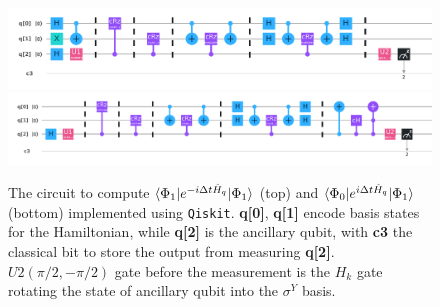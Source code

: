 \documentclass[journal=jctcce,manuscript=article]{achemso}
\begin{document}
\begin{figure}[h!]
  \centering
  \includegraphics[width=6.5in]{figs/phi1_cir4y.pdf}
  \includegraphics[width=6.5in]{figs/phi0+e1_cir_y.pdf}
  \caption{The circuit to compute $\braket{\Phi_1  | e^{-i \Delta t \hat{H}_q}  |  \Phi_1}$ (top) and $\braket{\Phi_0  | e^{i \Delta t \hat{H}_q}  |  \Phi_1}$ (bottom) implemented using \texttt{Qiskit}\cite{Qiskit}. \textbf{q[0]}, \textbf{q[1] }encode basis states for the Hamiltonian, while \textbf{q[2]} is the ancillary qubit, with \textbf{c3} the classical bit to store the output from measuring \textbf{q[2]}. $U2(\pi/2, -\pi/2)$ gate before the measurement is the $H_k$ gate rotating the state of ancillary qubit into the $\sigma^Y$ basis.  }
\label{h2_cir}
\end{figure}
\end{document}
